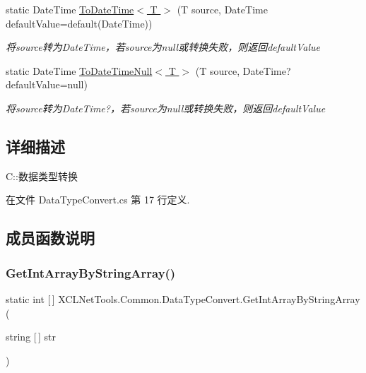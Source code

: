 \begin{DoxyCompactItemize}
static Date\+Time \hyperlink{class_x_c_l_net_tools_1_1_common_1_1_data_type_convert_ab7ad823410385f517c4e4f9ab43e3689}{To\+Date\+Time$<$ T $>$} (T source, Date\+Time default\+Value=default(Date\+Time))
\begin{DoxyCompactList}\small\item\em 将source转为\+Date\+Time，若source为null或转换失败，则返回default\+Value \end{DoxyCompactList}\item 
static Date\+Time \hyperlink{class_x_c_l_net_tools_1_1_common_1_1_data_type_convert_a78b698e24c4bed46ca473d8c3bc9e2c7}{To\+Date\+Time\+Null$<$ T $>$} (T source, Date\+Time? default\+Value=null)
\begin{DoxyCompactList}\small\item\em 将source转为\+Date\+Time?，若source为null或转换失败，则返回default\+Value \end{DoxyCompactList}\end{DoxyCompactItemize}


\subsection{详细描述}
C\+::数据类型转换 



在文件 Data\+Type\+Convert.\+cs 第 17 行定义.



\subsection{成员函数说明}
\mbox{\label{class_x_c_l_net_tools_1_1_common_1_1_data_type_convert_a4989f3ee0b2b95175ce7229c8e75a68a}} 
\subsubsection{\texorpdfstring{Get\+Int\+Array\+By\+String\+Array()}{GetIntArrayByStringArray()}\hspace{0.1cm}{\footnotesize\ttfamily [1/2]}}
{\footnotesize\ttfamily static int \mbox{[}$\,$\mbox{]} X\+C\+L\+Net\+Tools.\+Common.\+Data\+Type\+Convert.\+Get\+Int\+Array\+By\+String\+Array (\begin{DoxyParamCaption}\item[{string \mbox{[}$\,$\mbox{]}}]{str }\end{DoxyParamCaption})\hspace{0.3cm}{\ttfamily [static]}}




